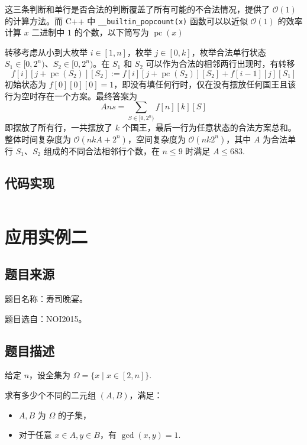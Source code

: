 这三条判断和单行是否合法的判断覆盖了所有可能的不合法情况，提供了
\(\mathcal{O}(1)\) 的计算方法。而 C++ 中
\texttt{\_\_builtin\_popcount(x)} 函数可以以近似 \(\mathcal{O}(1)\)
的效率计算 \(x\) 二进制中 \(1\) 的个数，以下简写为
\(\operatorname{pc}(x)\)

转移考虑从小到大枚举 \(i\in[1,n]\)，枚举 \(j\in[0,k]\)，枚举合法单行状态
\(S_1\in[0,2^n)\)、\(S_2\in[0,2^n)\)。在 \(S_1\) 和 \(S_2\)
可以作为合法的相邻两行出现时，有转移 \[
f[i][j+\operatorname{pc}(S_2)][S_2]:=f[i][j+\operatorname{pc}(S_2)][S_2]+f[i-1][j][S_1]
\] 初始状态为
\(f[0][0][0]=1\)，即没有填任何行时，仅在没有摆放任何国王且该行为空时存在一个方案。最终答案为
\[
Ans=\sum_{S\in[0,2^n)}f[n][k][S]
\] 即摆放了所有行，一共摆放了 \(k\)
个国王，最后一行为任意状态的合法方案总和。整体时间复杂度为
\(\mathcal{O}(nkA+2^n)\)，空间复杂度为 \(\mathcal{O}(nk2^n)\)，其中
\(A\) 为合法单行 \(S_1\)、\(S_2\) 组成的不同合法相邻行个数，在
\(n\le 9\) 时满足 \(A\le 683\).

\subsection{代码实现}

\inputminted[frame=lines, numbers=left, fontsize=\scriptsize, tabsize=4, breaklines=true]{c++}{code/1.cpp}

\section{应用实例二}

\subsection{题目来源}

题目名称：寿司晚宴。

题目选自：NOI2015。

\subsection{题目描述}

给定 \(n\)，设全集为 \(\Omega=\{x\mid x\in[2,n]\}\).

求有多少个不同的二元组 \((A,B)\)，满足：

\begin{itemize}

\item
  \(A,B\) 为 \(\Omega\) 的子集，
\item
  对于任意 \(x\in A,y\in B\)，有 \(\gcd(x,y)=1\).
\end{itemize}

